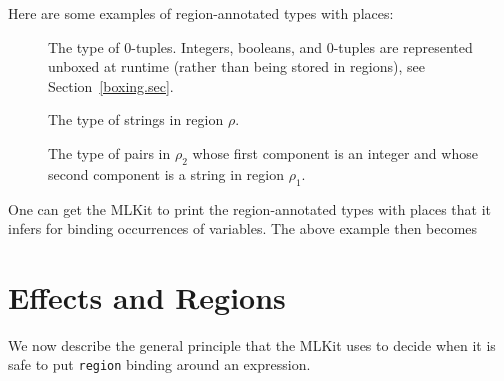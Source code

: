 \documentclass[12pt]{book}
\begin{document}
Here are some examples of region-annotated types with places:
\begin{description}
\item[] The type of 0-tuples.  Integers, booleans, and
  0-tuples are represented
  unboxed at runtime (rather than being stored in regions), see
  Section~\ref{boxing.sec}.
\item[] The type of strings in region $\rho$.
\item[]
  The type of pairs in $\rho_2$ whose first component is an integer and whose
  second component is a string in region $\rho_1$.
\end{description}

One can get the MLKit to print the region-annotated types with places that it
infers for binding occurrences of variables.  The above example then becomes

\section{Effects and Regions}
\label{effects.sec}

We now describe the general principle that the MLKit uses to decide when it is
safe to put
%
%
\lstinline{region} binding around an expression.
\end{document}
